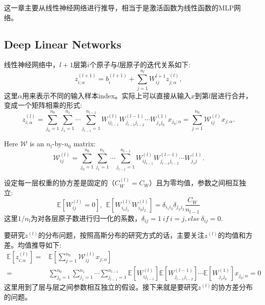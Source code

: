 这一章主要从线性神经网络进行推导，相当于是激活函数为线性函数的MLP网络。

\subsection{Deep Linear Networks}
\label{sec:3-1}

线性神经网络中，$l+1$层第$i$个原子与$l$层原子的迭代关系如下:
\begin{equation}
    z_{i;\alpha}^{(l+1)} = b_i^{(l+1)} + \sum_{j=1}^{n_l} W_{ij}^{l+1}z_{j;\alpha}^{(l)},
\end{equation}
这里$\alpha$用来表示不同的输入样本index。实际上可以直接从输入$x$到第$l$层进行合并，变成一个矩阵相乘的形式:
\begin{equation}
    z_{i;\alpha}^{(l)} = \sum_{j_0=1}^{n_0}\sum_{j_1=1}^{n_1} \cdots \sum_{j_{l-1}=1}^{n_{l-1}}
                W_{ij_{l-1}}^{(l)} W_{j_{l-1}j_{l-2}}^{(l-1)} \cdots W_{j_1j_0}^{(1)} x_{j_0;\alpha}
              = \sum_{j=1}^{n_0} \mathcal{W}_{ij}^{(l)} x_{j;\alpha}.
\end{equation}

Here $\mathcal{W}$ is an $n_l$-by-$n_0$ matrix:
\begin{equation}
    \mathcal{W}_{ij}^{(l)} = \sum_{j_0=1}^{n_0}\sum_{j_1=1}^{n_1} \cdots \sum_{j_{l-1}=1}^{n_{l-1}}
                W_{ij_{l-1}}^{(l)} W_{j_{l-1}j_{l-2}}^{(l-1)} \cdots W_{j_1j}^{(1)}.
\end{equation}

设定每一层权重的协方差是固定的（$C_W^{(l)} = C_W$）且为零均值，参数之间相互独立:
\begin{equation}
    \mathbb{E}[W_{ij}^{(l)} = 0], ~~ \mathbb{E}[W_{i_1j_1}^{(l)}W_{i_2j_2}^{(l)}] 
                                    = \delta_{i_1i_2}\delta_{j_1j_2}\frac{C_W}{n_{l-1}}
    \label{eq:expectation}
\end{equation}
这里$1/n_l$为对各层原子数进行归一化的系数，$\delta_{ij} = 1 ~ if ~ i=j, else ~ \delta_{ij} = 0$.

要研究$z^{(l)}$的分布问题，按照高斯分布的研究方式的话，主要关注$z^{(l)}$的均值和方差。均值推导如下:
\begin{equation}
    \begin{aligned}
    \mathbb{E}[z_{i;\alpha}^{(l)}] =& \mathbb{E}[\sum_{j=1}^{n_0} \mathcal{W}_{ij}^{(l)} x_{j;\alpha}] \\
     =& \sum_{j_0=1}^{n_0}\sum_{j_1=1}^{n_1} \cdots \sum_{j_{l-1}=1}^{n_{l-1}}
       \mathbb{E}[W_{ij_{l-1}}^{(l)}] \mathbb{E}[W_{j_{l-1}j_{l-2}}^{(l-1)}]
       \cdots \mathbb{E}[W_{j_1j_0}^{(1)}] x_{j_0;\alpha} = 0
    \end{aligned}
\end{equation}
这里用到了层与层之间参数相互独立的假设。接下来就是要研究$z^{(l)}$的协方差分布的问题。

